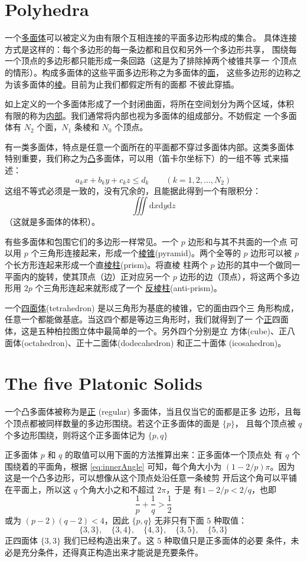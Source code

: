 \documentclass[cs4size,a4paper,adobefonts,openany]{ctexbook}
\newcommand{\pname}[1]{\underline{#1}}
\numberwithin{equation}{section}
\begin{document}
\section{Polyhedra}
一个\pname{多面体}可以被定义为由有限个互相连接的平面多边形构成的集合。
具体连接方式是这样的：每个多边形的每一条边都和且仅和另外一个多边形共享，
围绕每一个顶点的多边形都只能形成一条回路（这是为了排除掉两个棱锥共享一
  个顶点的情形）。构成多面体的这些平面多边形称之为多面体的\pname{面}，
这些多边形的边称之为该多面体的\pname{棱}。目前为止我们都假定所有的面都
不彼此穿插。

如上定义的一个多面体形成了一个封闭曲面，将所在空间划分为两个区域，体积
有限的称为\pname{内部}。我们通常将内部也视为多面体的组成部分。不妨假定
一个多面体有 $N_2$ 个面，$N_1$ 条棱和 $N_0$ 个顶点。

有一类多面体，特点是任意一个面所在的平面都不穿过多面体内部。这类多面体
特别重要，我们称之为\pname{凸}多面体，可以用（笛卡尔坐标下）的一组不等
式来描述：
\[
a_kx+b_ky+c_kz \leq d_k\qquad (k=1,2,\dots,N_2)
\]
这组不等式必须是一致的，没有冗余的，且能据此得到一个有限积分：
\[
\iiint\text{d}x\text{d}y\text{d}z
\]
（这就是多面体的体积）。

有些多面体和包围它们的多边形一样常见。一个 $p$ 边形和与其不共面的一个点
可以用 $p$ 个三角形连接起来，形成一个\pname{棱锥}(pyramid)。两个全等的
$p$ 边形可以被 $p$ 个长方形连起来形成一个直\pname{棱柱}(prism)。将直棱
柱两个 $p$ 边形的其中一个做同一平面内的旋转，使其顶点（边）正对应另一个
$p$ 边形的边（顶点），将这两个多边形用 $2p$ 个三角形连起来就形成了一个
\pname{反棱柱}(anti-prism)。

一个\pname{四面体}(tetrahedron) 是以三角形为基底的棱锥，它的面由四个三
角形构成，任意一个都能做基底。当这四个都是等边三角形时，我们就得到了一
个\pname{正}四面体，这是五种柏拉图立体中最简单的一个。另外四个分别是立
方体(cube)、正八面体(octahedron)、正十二面体(dodecahedron) 和正二十面体
(icosahedron)。

\section{The five Platonic Solids}

一个凸多面体被称为是\pname{正} (regular) 多面体，当且仅当它的面都是正多
边形，且每个顶点都被同样数量的多边形围绕。若这个正多面体的面是 $\{p\}$，
且每个顶点被 $q$ 个多边形围绕，则将这个正多面体记为 $\{p,q\}$

正多面体 $p$ 和 $q$ 的取值可以用下面的方法推算出来：正多面体一个顶点处
有 $q$ 个围绕着的平面角，根据 \eqref{eq:innerAngle} 可知，每个角大小为
$(1-2/p)\pi$。因为这是一个凸多边形，可以想像从这个顶点处沿任意一条棱剪
开后这个角可以平铺在平面上，所以这 $q$ 个角大小之和不超过 $2\pi$，于是
有$1-2/p<2/q$，也即
\begin{equation}
  \frac{1}{p}+\frac{1}{q}>\frac{1}{2}
\end{equation}
或为 $(p-2)(q-2)<4$，因此 $\{p,q\}$ 无非只有下面 $5$ 种取值：
\[
\{3,3\},\quad\{3,4\},\quad\{4,3\},\quad\{3,5\},\quad\{5,3\}
\]
正四面体 $\{3,3\}$ 我们已经构造出来了。这 $5$ 种取值只是正多面体的必要
条件，未必是充分条件，还得真正构造出来才能说是充要条件。
\end{document}
